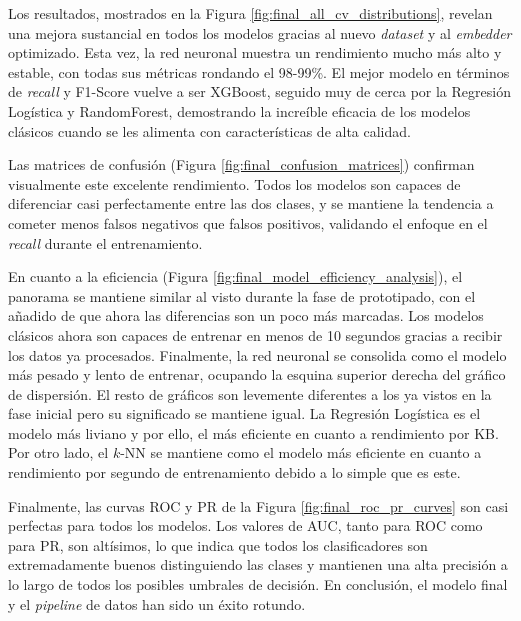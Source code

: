 
Los resultados, mostrados en la Figura \ref{fig:final_all_cv_distributions}, revelan una mejora sustancial en todos los modelos gracias al nuevo \textit{dataset} y al \textit{embedder} optimizado. Esta vez, la red neuronal muestra un rendimiento mucho más alto y estable, con todas sus métricas rondando el 98-99\%. El mejor modelo en términos de \textit{recall} y F1-Score vuelve a ser XGBoost, seguido muy de cerca por la Regresión Logística y RandomForest, demostrando la increíble eficacia de los modelos clásicos cuando se les alimenta con características de alta calidad.


Las matrices de confusión (Figura \ref{fig:final_confusion_matrices}) confirman visualmente este excelente rendimiento. Todos los modelos son capaces de diferenciar casi perfectamente entre las dos clases, y se mantiene la tendencia a cometer menos falsos negativos que falsos positivos, validando el enfoque en el \textit{recall} durante el entrenamiento.


En cuanto a la eficiencia (Figura \ref{fig:final_model_efficiency_analysis}), el panorama se mantiene similar al visto durante la fase de prototipado, con el añadido de que ahora las diferencias son un poco más marcadas. Los modelos clásicos ahora son capaces de entrenar en menos de 10 segundos gracias a recibir los datos ya procesados. Finalmente, la red neuronal se consolida como el modelo más pesado y lento de entrenar, ocupando la esquina superior derecha del gráfico de dispersión. El resto de gráficos son levemente diferentes a los ya vistos en la fase inicial pero su significado se mantiene igual. La Regresión Logística es el modelo más liviano y por ello, el más eficiente en cuanto a rendimiento por KB. Por otro lado, el $k$-NN se mantiene como el modelo más eficiente en cuanto a rendimiento por segundo de entrenamiento debido a lo simple que es este.


Finalmente, las curvas ROC y PR de la Figura \ref{fig:final_roc_pr_curves} son casi perfectas para todos los modelos. Los valores de AUC, tanto para ROC como para PR, son altísimos, lo que indica que todos los clasificadores son extremadamente buenos distinguiendo las clases y mantienen una alta precisión a lo largo de todos los posibles umbrales de decisión. En conclusión, el modelo final y el \textit{pipeline} de datos han sido un éxito rotundo.

